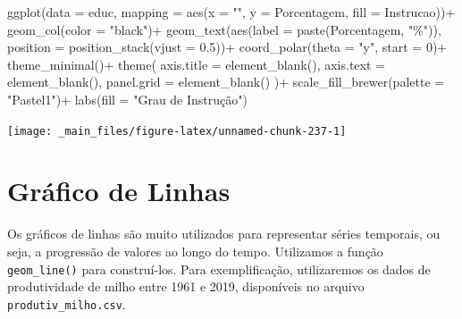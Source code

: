 \documentclass[
  brazilian,
]{book}
\newenvironment{Shaded}{\begin{snugshade}}{\end{snugshade}}
\newcommand{\AttributeTok}[1]{\textcolor[rgb]{0.77,0.63,0.00}{#1}}
\newcommand{\DecValTok}[1]{\textcolor[rgb]{0.00,0.00,0.81}{#1}}
\newcommand{\FloatTok}[1]{\textcolor[rgb]{0.00,0.00,0.81}{#1}}
\newcommand{\FunctionTok}[1]{\textcolor[rgb]{0.00,0.00,0.00}{#1}}
\newcommand{\NormalTok}[1]{#1}
\newcommand{\SpecialCharTok}[1]{\textcolor[rgb]{0.00,0.00,0.00}{#1}}
\newcommand{\StringTok}[1]{\textcolor[rgb]{0.31,0.60,0.02}{#1}}
\begin{document}
\begin{Shaded}
\begin{Highlighting}[]
\FunctionTok{ggplot}\NormalTok{(}\AttributeTok{data =}\NormalTok{ educ,}
       \AttributeTok{mapping =} \FunctionTok{aes}\NormalTok{(}\AttributeTok{x =} \StringTok{""}\NormalTok{,}
                     \AttributeTok{y =}\NormalTok{ Porcentagem,}
                     \AttributeTok{fill =}\NormalTok{ Instrucao))}\SpecialCharTok{+}
  \FunctionTok{geom\_col}\NormalTok{(}\AttributeTok{color =} \StringTok{"black"}\NormalTok{)}\SpecialCharTok{+}
  \FunctionTok{geom\_text}\NormalTok{(}\FunctionTok{aes}\NormalTok{(}\AttributeTok{label =} \FunctionTok{paste}\NormalTok{(Porcentagem, }\StringTok{"\%"}\NormalTok{)),}
            \AttributeTok{position =} \FunctionTok{position\_stack}\NormalTok{(}\AttributeTok{vjust =} \FloatTok{0.5}\NormalTok{))}\SpecialCharTok{+}
  \FunctionTok{coord\_polar}\NormalTok{(}\AttributeTok{theta =} \StringTok{"y"}\NormalTok{,}
              \AttributeTok{start =} \DecValTok{0}\NormalTok{)}\SpecialCharTok{+}
  \FunctionTok{theme\_minimal}\NormalTok{()}\SpecialCharTok{+}
  \FunctionTok{theme}\NormalTok{(}
    \AttributeTok{axis.title =} \FunctionTok{element\_blank}\NormalTok{(),}
    \AttributeTok{axis.text =} \FunctionTok{element\_blank}\NormalTok{(),}
    \AttributeTok{panel.grid =} \FunctionTok{element\_blank}\NormalTok{()}
\NormalTok{    )}\SpecialCharTok{+}
  \FunctionTok{scale\_fill\_brewer}\NormalTok{(}\AttributeTok{palette =} \StringTok{"Pastel1"}\NormalTok{)}\SpecialCharTok{+}
  \FunctionTok{labs}\NormalTok{(}\AttributeTok{fill =} \StringTok{"Grau de Instrução"}\NormalTok{)}
\end{Highlighting}
\end{Shaded}

\begin{center}\texttt{[image: \_main\_files/figure-latex/unnamed-chunk-237-1]} \end{center}

\hypertarget{gruxe1fico-de-linhas}{%
\section{Gráfico de Linhas}\label{gruxe1fico-de-linhas}}

Os gráficos de linhas são muito utilizados para representar séries temporais, ou seja, a progressão de valores ao longo do tempo. Utilizamos a função \texttt{geom\_line()} para construí-los. Para exemplificação, utilizaremos os dados de produtividade de milho entre 1961 e 2019, disponíveis no arquivo \texttt{produtiv\_milho.csv}.
\end{document}
